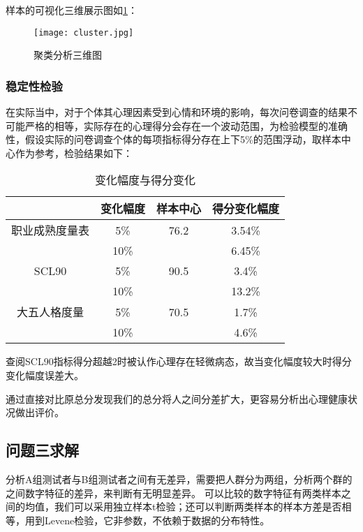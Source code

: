 \documentclass[withoutpreface,bwprint]{cumcmthesis} %
\begin{document}
样本的可视化三维展示图如\cref{fig:cluster}：
\begin{figure}[!h]
    \centering
    \texttt{[image: cluster.jpg]}
    \caption{聚类分析三维图}
    \label{fig:cluster}
\end{figure}



\subsubsection{稳定性检验}

在实际当中，对于个体其心理因素受到心情和环境的影响，每次问卷调查的结果不可能严格的相等，实际存在的心理得分会存在一个波动范围，为检验模型的准确性，假设实际的问卷调查个体的每项指标得分存在上下5\%的范围浮动，取样本中心作为参考，检验结果如下：

\begin{table}[h]
    \centering
    \begin{tabular}{cccc}
        \toprule
        & 变化幅度 & 样本中心 & 得分变化幅度 \\ \midrule
        职业成熟度量表 & 5\% & 76.2 & 3.54\% \\ 
        & 10\% & & 6.45\% \\ \midrule
        SCL90 & 5\% & 90.5 & 3.4\% \\ 
        & 10\% & & 13.2\% \\ \midrule
        大五人格度量 & 5\% & 70.5 & 1.7\% \\ 
        & 10\% & & 4.6\% \\ \bottomrule
    \end{tabular}
    \caption{变化幅度与得分变化}
    \label{tab:score_changes}
\end{table}

查阅SCL90指标得分超越2时被认作心理存在轻微病态，故当变化幅度较大时得分变化幅度误差大。

通过直接对比原总分发现我们的总分将人之间分差扩大，更容易分析出心理健康状况做出评价。


\subsection{问题三求解}

分析A组测试者与B组测试者之间有无差异，需要把人群分为两组，分析两个群的之间数字特征的差异，来判断有无明显差异。
可以比较的数字特征有两类样本之间的均值，我们可以采用独立样本t检验；还可以判断两类样本的样本方差是否相等，用到Levene检验，它非参数，不依赖于数据的分布特性。
\end{document}
